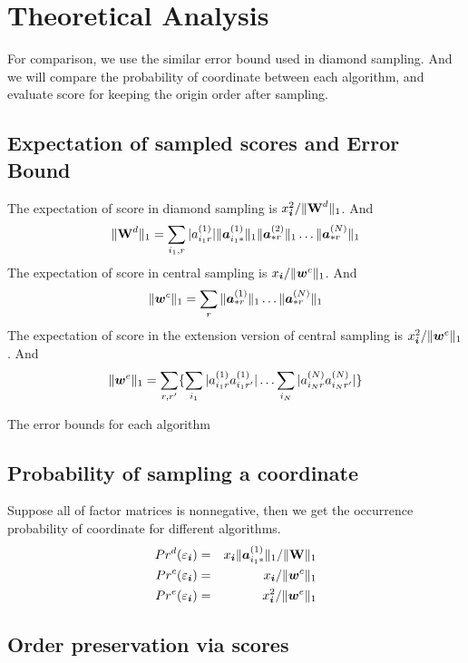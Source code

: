 \documentclass[letterpaper]{article}
\newcommand{\Sca}[3]{{#1}^{(#2)}_{i_#2#3}}%
\newcommand{\V}[1]{{\bm{{\MakeLowercase{#1}}}}}
\newcommand{\Varow}[1]{\V{a}^{(#1)}_{i_#1*}}
\newcommand{\Vacol}[1]{\V{a}^{(#1)}_{*r}}
\newcommand{\M}[1]{{\bm{\mathbf{\MakeUppercase{#1}}}}}
\newcommand{\norm}[2]{\|#1\|_{#2}}
\begin{document}
\section{Theoretical Analysis}

For comparison, we use the similar error bound used in diamond sampling. And we will compare the probability of coordinate between each algorithm, and evaluate score for keeping the origin order after sampling.

\subsection{Expectation of sampled scores and Error Bound}
The expectation of score in diamond sampling is $x^2_{\V{i}}/\norm{\M{W}^d}{1}$. And
\[
\norm{\M{W}^d}{1} = \sum_{i_1,r}|\Sca{a}{1}{r}|\norm{\Varow{1}}{1} \norm{\Vacol{2}}{1} \ldots \norm{\Vacol{N}}{1}
\]
The expectation of score in central sampling is $x_{\V{i}}/\norm{\V{W}^c}{1}$. And
\[
\norm{\V{W}^c}{1} = \sum_{r}\norm{\Vacol{1}}{1}\ldots\norm{\Vacol{N}}{1}
\]
The expectation of score in the extension version of central sampling is $x_{\V{i}}^2/\norm{\V{w}^e}{1}$. And
\[
\norm{\V{w}^e}{1} = \sum_{r,r'}\{\sum_{i_1}|\Sca{a}{1}{r}\Sca{a}{1}{r'}|\ldots\sum_{i_N}|\Sca{a}{N}{r}\Sca{a}{N}{r'}|\}
\]

The error bounds for each algorithm

\subsection{Probability of sampling a coordinate}

Suppose all of factor matrices is nonnegative, then we get the occurrence probability of coordinate for different algorithms.
\begin{eqnarray}
    \label{eq:ProbabilityDianomd}
    Pr^d(\varepsilon_{\V{i}}) & = & x_\V{i}\norm{\Varow{1}}{1}/\norm{\M{W}}{1}\\
    \label{eq:ProbabilityCentral}
    Pr^c(\varepsilon_{\V{i}}) & = & x_{\V{i}}/\norm{\V{W}^c}{1}\\
    \label{eq:ProbabilityExtensiom}
    Pr^e(\varepsilon_{\V{i}}) & = & x_{\V{i}}^2/\norm{\V{w}^e}{1}
\end{eqnarray}

\subsection{Order preservation via scores}
\end{document}
